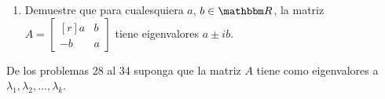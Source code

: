 \begin{multienumerate}
\end{multienumerate}\vspace{-0.5cm}
\begin{enumerate}[start=27]
    \item Demuestre que para cualesquiera $a$, $b \in \RR$, la matriz $A=\begin{bmatrix*}[r]a & b \\ -b & a\end{bmatrix*}$ tiene eigenvalores $a \pm i b$.
\end{enumerate}\newpage\noindent
De los problemas 28 al 34 suponga que la matriz $A$ tiene como eigenvalores a $\lambda_{1}, \lambda_{2}, \dots, \lambda_{k}$.
